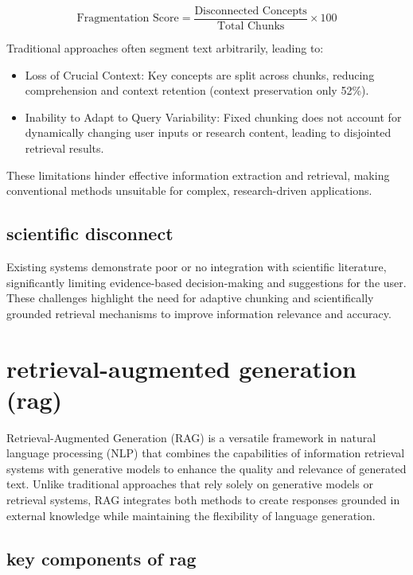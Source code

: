 \documentclass[conference]{IEEEtran}
\begin{document}
\begin{equation}  
\text{Fragmentation Score} = \frac{\text{Disconnected Concepts}}{\text{Total Chunks}} \times 100  
\end{equation}  

Traditional approaches often segment text arbitrarily, leading to:  

\begin{itemize}  
    \item Loss of Crucial Context: Key concepts are split across chunks, reducing comprehension and context retention (context preservation only 52\%).  
    \item Inability to Adapt to Query Variability: Fixed chunking does not account for dynamically changing user inputs or research content, leading to disjointed retrieval results.  
\end{itemize}  

These limitations hinder effective information extraction and retrieval, making conventional methods unsuitable for complex, research-driven applications.  

\subsection{scientific disconnect}
Existing systems demonstrate poor or no integration with scientific literature, significantly limiting evidence-based decision-making and suggestions for the user.\\

These challenges highlight the need for adaptive chunking and scientifically grounded retrieval mechanisms to improve information relevance and accuracy.  

\section{retrieval-augmented generation (rag)}

Retrieval-Augmented Generation (RAG) is a versatile framework in natural language processing (NLP) that combines the capabilities of information retrieval systems with generative models to enhance the quality and relevance of generated text. Unlike traditional approaches that rely solely on generative models or retrieval systems, RAG integrates both methods to create responses grounded in external knowledge while maintaining the flexibility of language generation. \cite{1} \cite{2}

\subsection{key components of rag}
\end{document}

